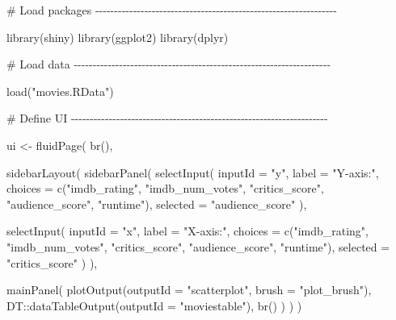 \documentclass[
  letterpaper,
  DIV=11,
  numbers=noendperiod]{scrreprt}
\newenvironment{Shaded}{\begin{snugshade}}{\end{snugshade}}
\newcommand{\AttributeTok}[1]{\textcolor[rgb]{0.40,0.46,0.14}{#1}}
\newcommand{\CommentTok}[1]{\textcolor[rgb]{0.37,0.37,0.37}{#1}}
\newcommand{\FunctionTok}[1]{\textcolor[rgb]{0.28,0.35,0.67}{#1}}
\newcommand{\NormalTok}[1]{\textcolor[rgb]{0.00,0.46,0.62}{#1}}
\newcommand{\OtherTok}[1]{\textcolor[rgb]{0.00,0.46,0.62}{#1}}
\newcommand{\SpecialCharTok}[1]{\textcolor[rgb]{0.37,0.37,0.37}{#1}}
\newcommand{\StringTok}[1]{\textcolor[rgb]{0.13,0.47,0.30}{#1}}
\begin{document}
\begin{Shaded}
\begin{Highlighting}[]
\CommentTok{\# Load packages {-}{-}{-}{-}{-}{-}{-}{-}{-}{-}{-}{-}{-}{-}{-}{-}{-}{-}{-}{-}{-}{-}{-}{-}{-}{-}{-}{-}{-}{-}{-}{-}{-}{-}{-}{-}{-}{-}{-}{-}{-}{-}{-}{-}{-}{-}{-}{-}{-}{-}{-}{-}{-}{-}{-}{-}{-}{-}{-}{-}{-}{-}{-}{-}}

\FunctionTok{library}\NormalTok{(shiny)}
\FunctionTok{library}\NormalTok{(ggplot2)}
\FunctionTok{library}\NormalTok{(dplyr)}

\CommentTok{\# Load data {-}{-}{-}{-}{-}{-}{-}{-}{-}{-}{-}{-}{-}{-}{-}{-}{-}{-}{-}{-}{-}{-}{-}{-}{-}{-}{-}{-}{-}{-}{-}{-}{-}{-}{-}{-}{-}{-}{-}{-}{-}{-}{-}{-}{-}{-}{-}{-}{-}{-}{-}{-}{-}{-}{-}{-}{-}{-}{-}{-}{-}{-}{-}{-}{-}{-}{-}{-}}

\FunctionTok{load}\NormalTok{(}\StringTok{"movies.RData"}\NormalTok{)}

\CommentTok{\# Define UI {-}{-}{-}{-}{-}{-}{-}{-}{-}{-}{-}{-}{-}{-}{-}{-}{-}{-}{-}{-}{-}{-}{-}{-}{-}{-}{-}{-}{-}{-}{-}{-}{-}{-}{-}{-}{-}{-}{-}{-}{-}{-}{-}{-}{-}{-}{-}{-}{-}{-}{-}{-}{-}{-}{-}{-}{-}{-}{-}{-}{-}{-}{-}{-}{-}{-}{-}{-}}

\NormalTok{ui }\OtherTok{\textless{}{-}} \FunctionTok{fluidPage}\NormalTok{(}
  \FunctionTok{br}\NormalTok{(),}

  \FunctionTok{sidebarLayout}\NormalTok{(}
    \FunctionTok{sidebarPanel}\NormalTok{(}
      \FunctionTok{selectInput}\NormalTok{(}
        \AttributeTok{inputId =} \StringTok{"y"}\NormalTok{, }\AttributeTok{label =} \StringTok{"Y{-}axis:"}\NormalTok{,}
        \AttributeTok{choices =} \FunctionTok{c}\NormalTok{(}\StringTok{"imdb\_rating"}\NormalTok{, }\StringTok{"imdb\_num\_votes"}\NormalTok{, }\StringTok{"critics\_score"}\NormalTok{, }\StringTok{"audience\_score"}\NormalTok{, }\StringTok{"runtime"}\NormalTok{),}
        \AttributeTok{selected =} \StringTok{"audience\_score"}
\NormalTok{      ),}

      \FunctionTok{selectInput}\NormalTok{(}
        \AttributeTok{inputId =} \StringTok{"x"}\NormalTok{, }\AttributeTok{label =} \StringTok{"X{-}axis:"}\NormalTok{,}
        \AttributeTok{choices =} \FunctionTok{c}\NormalTok{(}\StringTok{"imdb\_rating"}\NormalTok{, }\StringTok{"imdb\_num\_votes"}\NormalTok{, }\StringTok{"critics\_score"}\NormalTok{, }\StringTok{"audience\_score"}\NormalTok{, }\StringTok{"runtime"}\NormalTok{),}
        \AttributeTok{selected =} \StringTok{"critics\_score"}
\NormalTok{      )}
\NormalTok{    ),}

    \FunctionTok{mainPanel}\NormalTok{(}
      \FunctionTok{plotOutput}\NormalTok{(}\AttributeTok{outputId =} \StringTok{"scatterplot"}\NormalTok{, }\AttributeTok{brush =} \StringTok{"plot\_brush"}\NormalTok{),}
\NormalTok{      DT}\SpecialCharTok{::}\FunctionTok{dataTableOutput}\NormalTok{(}\AttributeTok{outputId =} \StringTok{"moviestable"}\NormalTok{),}
      \FunctionTok{br}\NormalTok{()}
\NormalTok{    )}
\NormalTok{  )}
\NormalTok{)}


\end{Highlighting}
\end{Shaded}
\end{document}
